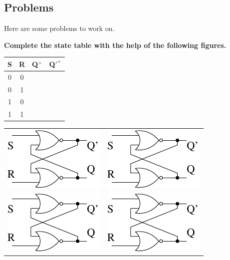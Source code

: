


\pagebreak
\subsection{Problems}
Here are some problems to work on.

{\bf Complete the state table with the help of the following figures.}

\begin{tabular}{c|c||c|c}
S & R & Q$^+$ & Q$'^+$ \\ \hline
0 & 0 &  &  \\ \hline
0 & 1 &  &  \\ \hline
1 & 0 &  &  \\ \hline
1 & 1 &  &  \\
\end{tabular}

\begin{tabular}{p{2in} p{2in}}
\includegraphics{./FigWork/SRlatch} & \includegraphics{./FigWork/SRlatch} \\ 
\includegraphics{./FigWork/SRlatch} & \includegraphics{./FigWork/SRlatch} \\
\end{tabular}

